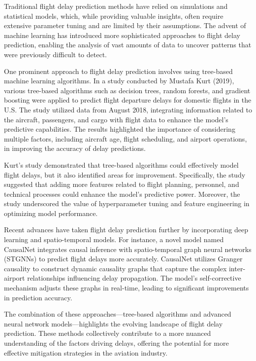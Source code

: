 \documentclass[conference]{IEEEtran}
\begin{document}
Traditional flight delay prediction methods have relied on simulations and statistical models, which, while providing valuable insights, often require extensive parameter tuning and are limited by their assumptions. The advent of machine learning has introduced more sophisticated approaches to flight delay prediction, enabling the analysis of vast amounts of data to uncover patterns that were previously difficult to detect.

One prominent approach to flight delay prediction involves using tree-based machine learning algorithms. In a study conducted by Mustafa Kurt (2019), various tree-based algorithms such as decision trees, random forests, and gradient boosting were applied to predict flight departure delays for domestic flights in the U.S. The study utilized data from August 2018, integrating information related to the aircraft, passengers, and cargo with flight data to enhance the model's predictive capabilities. The results highlighted the importance of considering multiple factors, including aircraft age, flight scheduling, and airport operations, in improving the accuracy of delay predictions.

Kurt's study demonstrated that tree-based algorithms could effectively model flight delays, but it also identified areas for improvement. Specifically, the study suggested that adding more features related to flight planning, personnel, and technical processes could enhance the model's predictive power. Moreover, the study underscored the value of hyperparameter tuning and feature engineering in optimizing model performance.

Recent advances have taken flight delay prediction further by incorporating deep learning and spatio-temporal models. For instance, a novel model named CausalNet integrates causal inference with spatio-temporal graph neural networks (STGNNs) to predict flight delays more accurately. CausalNet utilizes Granger causality to construct dynamic causality graphs that capture the complex inter-airport relationships influencing delay propagation. The model's self-corrective mechanism adjusts these graphs in real-time, leading to significant improvements in prediction accuracy.

The combination of these approaches—tree-based algorithms and advanced neural network models—highlights the evolving landscape of flight delay prediction. These methods collectively contribute to a more nuanced understanding of the factors driving delays, offering the potential for more effective mitigation strategies in the aviation industry.
\end{document}
